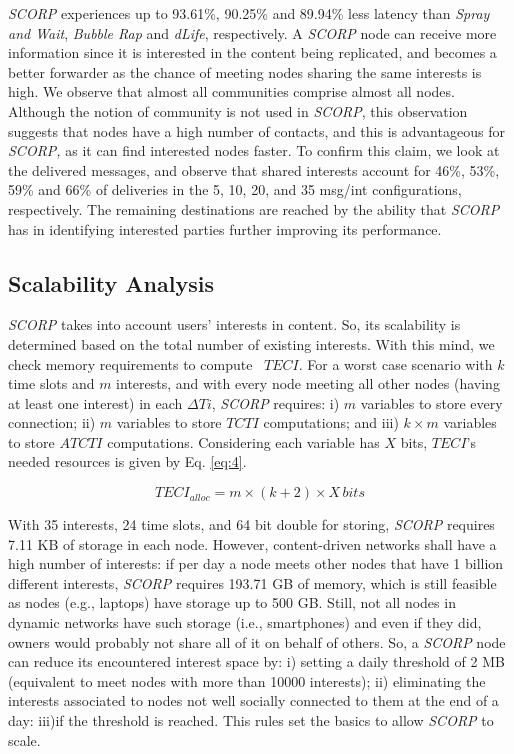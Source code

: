 \documentclass[lnicst]{svmultln}
\begin{document}
\emph{SCORP} experiences up to 93.61\%, 90.25\% and 89.94\% less latency
than \emph{Spray and Wait}, \emph{Bubble Rap} and \emph{dLife}, respectively.
A \emph{SCORP} node can receive more information since it is interested
in the content being replicated, and becomes a better forwarder as
the chance of meeting nodes sharing the same interests is high. We
observe that almost all communities comprise almost all nodes. Although
the notion of community is not used in \emph{SCORP}, this observation
suggests that nodes have a high number of contacts, and this is advantageous
for \emph{SCORP,} as it can find interested nodes faster. To confirm
this claim, we look at the delivered messages, and observe that shared
interests account for 46\%, 53\%, 59\% and 66\% of deliveries in the
5, 10, 20, and 35 msg/int configurations, respectively. The remaining
destinations are reached by the ability that \emph{SCORP} has in identifying
interested parties further improving its performance. 


\subsection{Scalability Analysis}

\emph{SCORP} takes into account users' interests in content. So, its
scalability is determined based on the total number of existing interests.
With this mind, we check memory requirements to compute~ $TECI$.
For a worst case scenario with $k$ time slots and $m$ interests,
and with every node meeting all other nodes (having at least one interest)
in each $\Delta Ti$, \emph{SCORP} requires: i) $m$ variables to
store every connection; ii) $m$ variables to store $TCTI$ computations;
and iii) $k\times m$ variables to store $ATCTI$ computations. Considering
each variable has $X$ bits, $TECI$'s needed resources is given by
Eq. \ref{eq:4}. 

\begin{equation}
TECI_{alloc}=m\times(k+2)\times X\, bits\label{eq:4}
\end{equation}


With 35 interests, 24 time slots, and 64 bit double for storing, \emph{SCORP}
requires 7.11 KB of storage in each node. However, content-driven
networks shall have a high number of interests: if per day a node
meets other nodes that have 1 billion different interests, \emph{SCORP}
requires 193.71 GB of memory, which is still feasible as nodes (e.g.,
laptops) have storage up to 500 GB. Still, not all nodes in dynamic
networks have such storage (i.e., smartphones) and even if they did,
owners would probably not share all of it on behalf of others. So,
a \emph{SCORP} node can reduce its encountered interest space by:
i) setting a daily threshold of 2 MB (equivalent to meet nodes with
more than 10000 interests); ii) eliminating the interests associated
to nodes not well socially connected to them at the end of a day:
iii)if the threshold is reached. This rules set the basics to allow
\emph{SCORP} to scale. 
\end{document}
